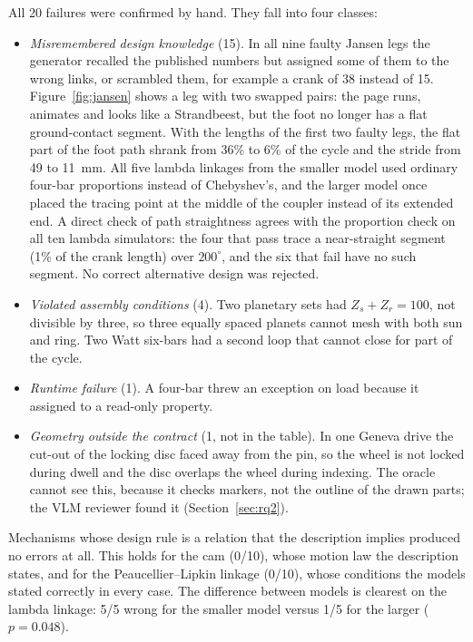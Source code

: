 All 20 failures were confirmed by hand. They fall into four classes:
\begin{itemize}
\item \emph{Misremembered design knowledge} (15). In all nine faulty Jansen legs the generator recalled the published numbers but assigned some of them to the wrong links, or scrambled them, for example a crank of 38 instead of 15. Figure~\ref{fig:jansen} shows a leg with two swapped pairs: the page runs, animates and looks like a Strandbeest, but the foot no longer has a flat ground-contact segment. With the lengths of the first two faulty legs, the flat part of the foot path shrank from 36\% to 6\% of the cycle and the stride from 49 to 11~mm. All five lambda linkages from the smaller model used ordinary four-bar proportions instead of Chebyshev's, and the larger model once placed the tracing point at the middle of the coupler instead of its extended end. A direct check of path straightness agrees with the proportion check on all ten lambda simulators: the four that pass trace a near-straight segment (1\% of the crank length) over $200^\circ$, and the six that fail have no such segment. No correct alternative design was rejected.
\item \emph{Violated assembly conditions} (4). Two planetary sets had $Z_s+Z_r=100$, not divisible by three, so three equally spaced planets cannot mesh with both sun and ring. Two Watt six-bars had a second loop that cannot close for part of the cycle.
\item \emph{Runtime failure} (1). A four-bar threw an exception on load because it assigned to a read-only property.
\item \emph{Geometry outside the contract} (1, not in the table). In one Geneva drive the cut-out of the locking disc faced away from the pin, so the wheel is not locked during dwell and the disc overlaps the wheel during indexing. The oracle cannot see this, because it checks markers, not the outline of the drawn parts; the VLM reviewer found it (Section~\ref{sec:rq2}).
\end{itemize}
Mechanisms whose design rule is a relation that the description implies produced no errors at all. This holds for the cam (0/10), whose motion law the description states, and for the Peaucellier--Lipkin linkage (0/10), whose conditions the models stated correctly in every case. The difference between models is clearest on the lambda linkage: 5/5 wrong for the smaller model versus 1/5 for the larger ($p=0.048$).

